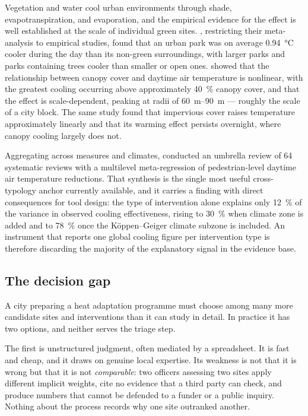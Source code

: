 Vegetation and water cool urban environments through shade, evapotranspiration,
and evaporation, and the empirical evidence for the effect is well established
at the scale of individual green sites. \textcite{bowler2010}, restricting their
meta-analysis to empirical studies, found that an urban park was on average
\SI{0.94}{\degreeCelsius} cooler during the day than its non-green
surroundings, with larger parks and parks containing trees cooler than smaller
or open ones. \textcite{ziter2019} showed that the relationship between canopy
cover and daytime air temperature is nonlinear, with the greatest cooling
occurring above approximately \SI{40}{\percent} canopy cover, and that the
effect is scale-dependent, peaking at radii of \SIrange{60}{90}{\metre} ---
roughly the scale of a city block. The same study found that impervious cover
raises temperature approximately linearly and that its warming effect persists
overnight, where canopy cooling largely does not.

Aggregating across measures and climates, \textcite{keravec2026} conducted an
umbrella review of 64 systematic reviews with a multilevel meta-regression of
pedestrian-level daytime air temperature reductions. That synthesis is the
single most useful cross-typology anchor currently available, and it carries a
finding with direct consequences for tool design: the type of intervention
alone explains only \SI{12}{\percent} of the variance in observed cooling
effectiveness, rising to \SI{30}{\percent} when climate zone is added and to
\SI{78}{\percent} once the K\"oppen--Geiger climate subzone is included. An
instrument that reports one global cooling figure per intervention type is
therefore discarding the majority of the explanatory signal in the evidence
base.

\subsection{The decision gap}

A city preparing a heat adaptation programme must choose among many more
candidate sites and interventions than it can study in detail. In practice it
has two options, and neither serves the triage step.

The first is unstructured judgment, often mediated by a spreadsheet. It is fast
and cheap, and it draws on genuine local expertise. Its weakness is not that it
is wrong but that it is not \emph{comparable}: two officers assessing two sites
apply different implicit weights, cite no evidence that a third party can
check, and produce numbers that cannot be defended to a funder or a public
inquiry. Nothing about the process records why one site outranked another.

